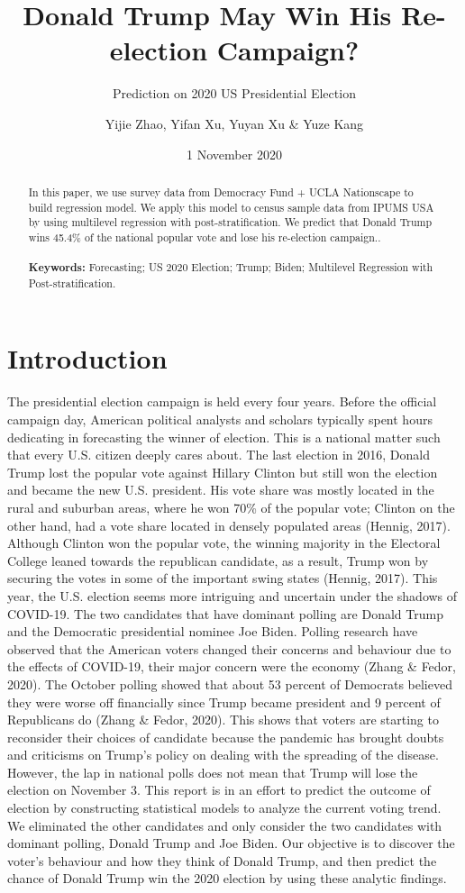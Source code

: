 \documentclass[
]{article}
\title{Donald Trump May Win His Re-election Campaign?}
\subtitle{Prediction on 2020 US Presidential Election}
\author{Yijie Zhao, Yifan Xu, Yuyan Xu \& Yuze Kang}
\date{1 November 2020}
\begin{document}
\maketitle
\begin{abstract}
In this paper, we use survey data from Democracy Fund + UCLA Nationscape
to build regression model. We apply this model to census sample data
from IPUMS USA by using multilevel regression with post-stratification.
We predict that Donald Trump wins 45.4\% of the national popular vote
and lose his re-election campaign..\\
~\\
\textbf{Keywords:} Forecasting; US 2020 Election; Trump; Biden;
Multilevel Regression with Post-stratification.
\end{abstract}

\hypertarget{introduction}{%
\section{Introduction}\label{introduction}}

The presidential election campaign is held every four years. Before the
official campaign day, American political analysts and scholars
typically spent hours dedicating in forecasting the winner of election.
This is a national matter such that every U.S. citizen deeply cares
about. The last election in 2016, Donald Trump lost the popular vote
against Hillary Clinton but still won the election and became the new
U.S. president. His vote share was mostly located in the rural and
suburban areas, where he won 70\% of the popular vote; Clinton on the
other hand, had a vote share located in densely populated areas (Hennig,
2017). Although Clinton won the popular vote, the winning majority in
the Electoral College leaned towards the republican candidate, as a
result, Trump won by securing the votes in some of the important swing
states (Hennig, 2017). This year, the U.S. election seems more
intriguing and uncertain under the shadows of COVID-19. The two
candidates that have dominant polling are Donald Trump and the
Democratic presidential nominee Joe Biden. Polling research have
observed that the American voters changed their concerns and behaviour
due to the effects of COVID-19, their major concern were the economy
(Zhang \& Fedor, 2020). The October polling showed that about 53 percent
of Democrats believed they were worse off financially since Trump became
president and 9 percent of Republicans do (Zhang \& Fedor, 2020). This
shows that voters are starting to reconsider their choices of candidate
because the pandemic has brought doubts and criticisms on Trump's policy
on dealing with the spreading of the disease. However, the lap in
national polls does not mean that Trump will lose the election on
November 3. This report is in an effort to predict the outcome of
election by constructing statistical models to analyze the current
voting trend. We eliminated the other candidates and only consider the
two candidates with dominant polling, Donald Trump and Joe Biden. Our
objective is to discover the voter's behaviour and how they think of
Donald Trump, and then predict the chance of Donald Trump win the 2020
election by using these analytic findings.
\end{document}
